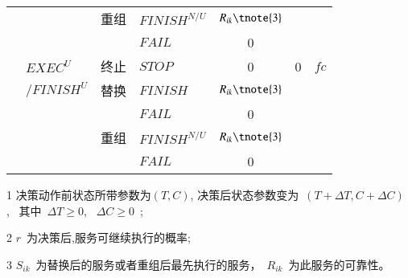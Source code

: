 \begin{table}[htbp]
\begin{threeparttable}
\begin{tabular}{clclccc}
            {}
            & {}
            & {重组} 
            & {$FINISH^{N/U}$} 
            & $R_{ik}\tnote{3}$ 
            & {\multirow{2}{*}{$\sum\limits_{x = i}^j {({T_{xk}} - {T_{x0}})} $}}
            & {\multirow{2}{*}{$\sum\limits_{x = i}^j {({C_{xk}} - {C_{x0}})} $}} \\
            
            
            {}
            & {}
            & {} 
            & {$FAIL$} 
            & {0}
            & {} 
            & {} \\
            {} 
            & {${EXEC^U}$}
            & {终止}
            & {$STOP$} 
            & {0} 
            & {0} 
            & {$fc$} \\
            
            {}
            & \multicolumn{1}{r}{$/FINISH^U$}
            & {替换} 
            & {$FINISH$} 
            & $R_{ik}\tnote{3}$ 
            & {\multirow{2}{*}{$T_{ik}$}} 
            & {\multirow{2}{*}{$C_{ik}$}} \\
            
            {}
            & {}
            & {} 
            & {$FAIL$} 
            & {0}
            & {} 
            & {} \\
            
            {}
            & {}
            & {重组} 
            & {$FINISH^{N/U}$} 
            & $R_{ik}\tnote{3}$ 
            & {\multirow{2}{*}{$T_{i0}+\sum\limits_{x = i}^j {({T_{xk}} - {T_{x0}})} $}}
            & {\multirow{2}{*}{$C_{i0}+\sum\limits_{x = i}^j {({C_{xk}} - {C_{x0}})} $}} \\
            
            
            {}
            & {}
            & {} 
            & {$FAIL$} 
            & {0}
            & {} 
            & {} \\
            
            \bottomrule
        \end{tabular}%
        
        \begin{tablenotes}
            \item[1] 决策动作前状态所带参数为$(T,C)$, 决策后状态参数变为~$(T+\Delta T, C+\Delta C)$,~ 其中~$\Delta T \ge 0$, ~$\Delta C \ge 0$~; 
            \item[2] $r$~为决策后,服务可继续执行的概率;
            \item[3] $S_{ik}$~为替换后的服务或者重组后最先执行的服务，~$R_{ik}$~为此服务的可靠性。
        \end{tablenotes}
    \end{threeparttable}
\end{table}%


